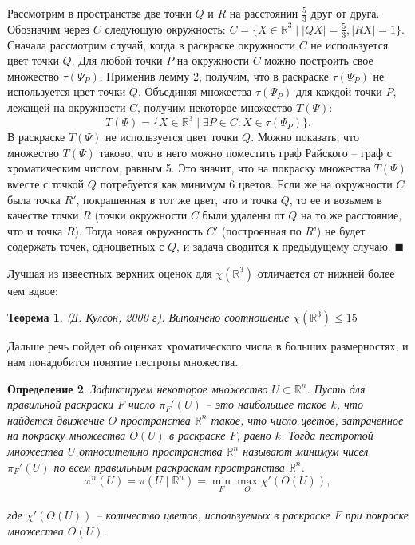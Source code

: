 \documentclass{report}%
\newtheorem{theorem}{Теорема}
\newtheorem{definition}[theorem]{Определение}
\newenvironment{proof}{\par\noindent{\bf Доказательство.}}{\hfill$\scriptstyle\blacksquare$}
\begin{document}
\begin{proof}
		Рассмотрим в пространстве две точки $Q$ и $R$ на расстоянии $\frac{5}{3}$ друг от друга.
		Обозначим через $C$ следующую окружность: $ C = \{X \in  \mathbb{R}^3 \mid |QX|= \frac{5}{3},|RX| = 1 \}$.
		Сначала рассмотрим случай, когда в раскраске окружности $C$ не используется цвет точки $Q$. 
		Для любой точки $P$ на окружности $C$ можно построить свое множество $\tau(\Psi_P)$.
		Применив лемму 2, получим, что в раскраске $\tau(\Psi_P)$ не используется цвет точки $Q$.
		Объединяя множества $\tau(\Psi_P)$ для каждой точки $P$, лежащей на 	окружности $C$, получим некоторое множество $T(\Psi)$: 
		\begin{equation}
				T(\Psi) = \{X \in \mathbb{R}^3 \mid \exists P \in C \colon X \in \tau(\Psi_P) \}.
		\end{equation}
		В раскраске $T(\Psi)$ не используется цвет точки $Q$. Можно показать, что множество $T(\Psi)$ таково,
		что в него можно поместить граф Райского – граф с хроматическим числом, равным 5.
		Это значит, что на покраску множества $T(\Psi)$ вместе с точкой $Q$ потребуется как минимум 6 цветов.
		Если же на окружности $C$ была точка $R'$, покрашенная в тот же цвет, что и точка $Q$,
		то ее и возьмем в качестве точки $R$ (точки окружности $C$ были удалены от $Q$ на то же расстояние, что и точка $R$).
		Тогда новая окружность $C'$ (построенная по $R’$) не будет содержать точек, одноцветных с $Q$, и задача сводится к предыдущему случаю.
\end{proof}

Лучшая из известных верхних оценок для $\chi(\mathbb{R}^3)$ отличается от нижней более чем вдвое:

\begin{theorem} (Д. Кулсон, 2000 г).
		Выполнено соотношение $\chi(\mathbb{R}^3) \leq 15$
\end{theorem}

Дальше речь пойдет об оценках хроматического числа в больших размерностях, и нам понадобится понятие пестроты множества.

\begin{definition}
		Зафиксируем некоторое множество $U \subset \mathbb{R}^n$. Пусть для правильной раскраски $F$
		число $\pi_F'(U)$ – это наибольшее такое $k$, что найдется движение $O$ пространства $\mathbb{R}^n$ такое,
		что число цветов, затраченное на покраску множества $O(U)$ в раскраске $F$, равно $k$.
		Тогда пестротой множества $U$ относительно пространства $\mathbb{R}^n$ называют
		минимум чисел $\pi_F'(U)$ по всем правильным раскраскам пространства $\mathbb{R}^n$.
		\begin{equation}
				\pi^n(U) = \pi(U \mid \mathbb{R}^n) = \min_F\max_O\chi'(O(U)),
		\end{equation} \\
		где $\chi'(O(U))$ – количество цветов, используемых в раскраске $F$ при покраске множества $O(U)$.
\end{definition}
\end{document}
